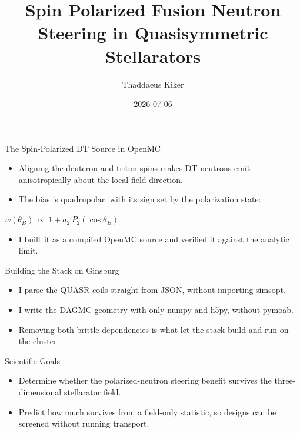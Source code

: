 \documentclass[11pt,aspectratio=169]{beamer}
\title{Spin Polarized Fusion Neutron Steering in Quasisymmetric Stellarators}
\author{Thaddaeus Kiker}
\date{2026-07-06}
\begin{document}
\begin{frame}\titlepage\end{frame}

\begin{frame}{The Spin-Polarized DT Source in OpenMC}
  \begin{itemize}
    \item Aligning the deuteron and triton spins makes DT neutrons emit anisotropically about
      the local field direction.
    \item The bias is quadrupolar, with its sign set by the polarization state:
  \end{itemize}
  \vspace{2pt}
  \begin{center}\large $w(\theta_B)\ \propto\ 1 + a_2\,P_2(\cos\theta_B)$\end{center}
  \vspace{2pt}
  \begin{itemize}
    \item I built it as a compiled OpenMC source and verified it against the analytic limit.
  \end{itemize}
\end{frame}

\begin{frame}{Building the Stack on Ginsburg}
  \begin{itemize}
    \item I parse the QUASR coils straight from JSON, without importing simsopt.
    \item I write the DAGMC geometry with only numpy and h5py, without pymoab.
    \item Removing both brittle dependencies is what let the stack build and run on the cluster.
  \end{itemize}
\end{frame}

\begin{frame}{Scientific Goals}
  \begin{itemize}
    \item Determine whether the polarized-neutron steering benefit survives the
      three-dimensional stellarator field.
    \item Predict how much survives from a field-only statistic, so designs can be screened
      without running transport.
  \end{itemize}
\end{frame}
\end{document}

